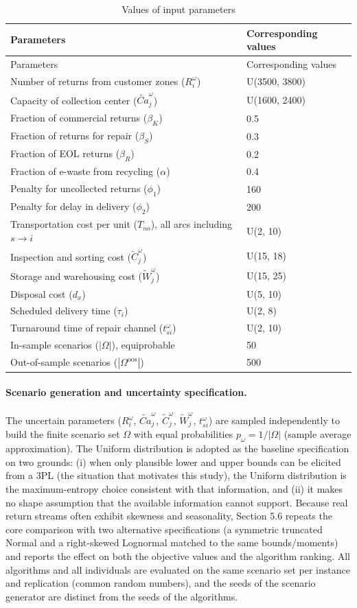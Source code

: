 \documentclass[11pt, a4paper]{article}
\begin{document}
\begin{longtable}[]{@{}ll@{}}
\caption{Values of input parameters}\tabularnewline
\toprule
Parameters & Corresponding values\tabularnewline
\midrule
\endfirsthead
\toprule
Parameters & Corresponding values\tabularnewline
\midrule
\endhead
Number of returns from customer zones ($R_i^{\omega}$) & U(3500,
3800)\tabularnewline
Capacity of collection center ($\widetilde{Ca}_j^{\omega}$) & U(1600,
2400)\tabularnewline
Fraction of commercial returns ($\beta_K$) & 0.5\tabularnewline
Fraction of returns for repair ($\beta_S$) & 0.3\tabularnewline
Fraction of EOL returns ($\beta_R$) & 0.2\tabularnewline
Fraction of e-waste from recycling ($\alpha$) & 0.4\tabularnewline
Penalty for uncollected returns ($\phi_1$) & 160\tabularnewline
Penalty for delay in delivery ($\phi_2$) & 200\tabularnewline
Transportation cost per unit ($T_{no}$), all arcs including
$s \rightarrow i$ & U(2, 10)\tabularnewline
Inspection and sorting cost ($\widetilde{C}_j^{\omega}$) & U(15,
18)\tabularnewline
Storage and warehousing cost ($\widetilde{W}_j^{\omega}$) & U(15,
25)\tabularnewline
Disposal cost ($d_x$) & U(5, 10)\tabularnewline
Scheduled delivery time ($\tau_i$) & U(2, 8)\tabularnewline
Turnaround time of repair channel ($t_{si}^{\omega}$) & U(2,
10)\tabularnewline
In-sample scenarios ($|\Omega|$), equiprobable & 50\tabularnewline
Out-of-sample scenarios ($|\Omega^{\mathrm{oos}}|$) &
500\tabularnewline
\bottomrule
\end{longtable}
\protect\hypertarget{tab:Values}{}{}
\paragraph{Scenario generation and uncertainty specification.}The
uncertain parameters ($R_i^{\omega}$, $\widetilde{Ca}_j^{\omega}$,
$\widetilde{C}_j^{\omega}$, $\widetilde{W}_j^{\omega}$, $t_{si}^{\omega}$) are sampled independently to build the finite scenario set $\Omega$ with equal probabilities $p_{\omega} = 1/|\Omega|$ (sample average approximation). The Uniform
distribution is adopted as the baseline specification on two grounds: (i) when only plausible lower and upper bounds can be elicited from a 3PL (the situation that motivates this study), the Uniform distribution is the maximum-entropy choice consistent with that information, and (ii) it makes no shape assumption that the available information cannot support. Because real return streams often exhibit skewness and seasonality, Section 5.6 repeats the core comparison with two alternative specifications (a symmetric truncated Normal and a right-skewed Lognormal matched to the same bounds/moments) and reports the effect on both the objective values and the algorithm ranking. All algorithms and all individuals are evaluated on the same scenario set per instance and replication (common random numbers), and the seeds of the scenario generator are distinct from the seeds of the algorithms.
\end{document}
